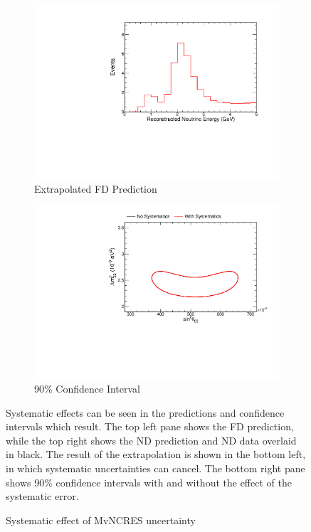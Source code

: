 {\begin{figure}
\begin{center}
\begin{subfigure}[c]{0.49\textwidth}
\includegraphics[width=\textwidth]{figures/systs/prediction/fd_extrap_prediction_MvNCRES.pdf}
\caption*{Extrapolated FD Prediction}
\end{subfigure}
\begin{subfigure}[c]{0.49\textwidth}
\includegraphics[width=\textwidth]{figures/systs/prediction/fd_extrap_contour_MvNCRES.pdf}
\caption*{90\% Confidence Interval}
\end{subfigure}
\end{center}
\caption{Systematic effect of MvNCRES uncertainty}{
Systematic effects can be seen in the predictions and confidence intervals
which result.
The top left pane shows the FD prediction, while the top right shows the
ND prediction and ND data overlaid in black.
The result of the extrapolation is shown in the bottom left, in which
systematic uncertainties can cancel.
The bottom right pane shows 90\% confidence intervals with and without
the effect of the systematic error.}
\label{syst_fig_MvNCRES}


\end{figure}}
